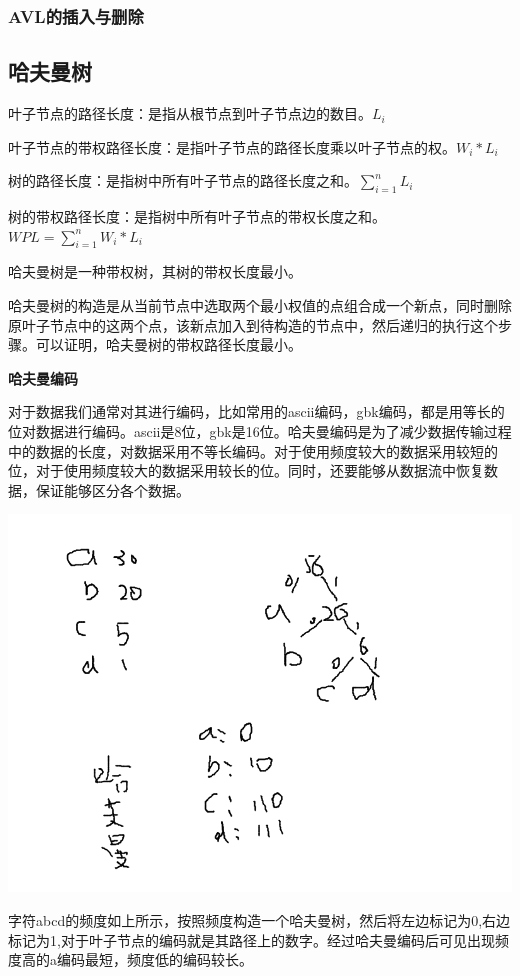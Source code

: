 \documentclass{article}
\begin{document}
		\subsubsection{AVL的插入与删除}
	\subsection{哈夫曼树}
		叶子节点的路径长度：是指从根节点到叶子节点边的数目。$L_i$

		叶子节点的带权路径长度：是指叶子节点的路径长度乘以叶子节点的权。$W_i*L_i$

		树的路径长度：是指树中所有叶子节点的路径长度之和。$\sum^{n}_{i=1}{L_i}$

		树的带权路径长度：是指树中所有叶子节点的带权长度之和。$WPL=\sum_{i=1}^{n}{W_i*L_i}$

		哈夫曼树是一种带权树，其树的带权长度最小。

		哈夫曼树的构造是从当前节点中选取两个最小权值的点组合成一个新点，同时删除原叶子节点中的这两个点，该新点加入到待构造的节点中，然后递归的执行这个步骤。可以证明，哈夫曼树的带权路径长度最小。

		\textbf{哈夫曼编码}

		对于数据我们通常对其进行编码，比如常用的ascii编码，gbk编码，都是用等长的位对数据进行编码。ascii是8位，gbk是16位。哈夫曼编码是为了减少数据传输过程中的数据的长度，对数据采用不等长编码。对于使用频度较大的数据采用较短的位，对于使用频度较大的数据采用较长的位。同时，还要能够从数据流中恢复数据，保证能够区分各个数据。

		\includegraphics[scale=0.4]{./pic/tree-05.png}

		字符abcd的频度如上所示，按照频度构造一个哈夫曼树，然后将左边标记为0,右边标记为1,对于叶子节点的编码就是其路径上的数字。经过哈夫曼编码后可见出现频度高的a编码最短，频度低的编码较长。
\end{document}
